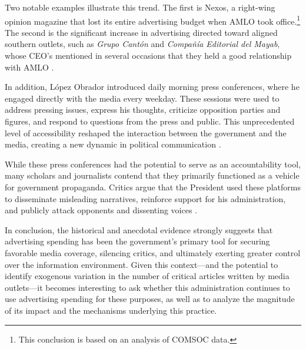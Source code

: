 Two notable examples illustrate this trend. The first is Nexos, a right-wing opinion magazine that lost its entire advertising budget when AMLO took office.\footnote{This conclusion is based on an analysis of COMSOC data.} The second is the significant increase in advertising directed toward aligned southern outlets, such as \textit{Grupo Cantón} and \textit{Compañía Editorial del Mayab}, whose CEO's mentioned in several occasions that they held a good relationship with AMLO \citep{Animal-Discrecionalidad}.

In addition, López Obrador introduced daily morning press conferences, where he engaged directly with the media every weekday. These sessions were used to address pressing issues, express his thoughts, criticize opposition parties and figures, and respond to questions from the press and public. This unprecedented level of accessibility reshaped the interaction between the government and the media, creating a new dynamic in political communication \citep{ThugMex-VictorHugo-JourPract}.

While these press conferences had the potential to serve as an accountability tool, many scholars and journalists contend that they primarily functioned as a vehicle for government propaganda. Critics argue that the President used these platforms to disseminate misleading narratives, reinforce support for his administration, and publicly attack opponents and dissenting voices \citep{OtrosDatos}. 

In conclusion, the historical and anecdotal evidence strongly suggests that advertising spending has been the government’s primary tool for securing favorable media coverage, silencing critics, and ultimately exerting greater control over the information environment. Given this context---and the potential to identify exogenous variation in the number of critical articles written by media outlets---it becomes interesting to ask whether this administration continues to use advertising spending for these purposes, as well as to analyze the magnitude of its impact and the mechanisms underlying this practice.